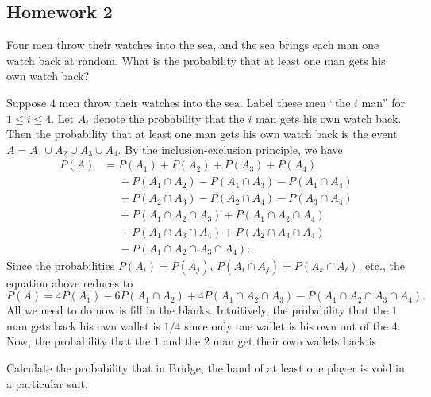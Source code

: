 \subsection{Homework 2}
\begin{problem}[Handout 2, \# 5]
  Four men throw their watches into the sea, and the sea brings each man
  one watch back at random. What is the probability that at least one man
  gets his own watch back?
\end{problem}
\begin{solution*}
  Suppose \(4\) men throw their watches into the sea. Label these men ``the
  \(i\) man'' for \(1\leq i\leq 4\). Let \(A_i\) denote the
  probability that the \(i\) man gets his own watch back. Then
  the probability that at least one man gets his own watch back is the
  event \(A=A_1\cup A_2\cup A_3\cup A_4\). By the inclusion-exclusion
  principle, we have
  \[
    \begin{aligned}
      P(
      A)&=P(A_1)+P(A_2)+P(A_3)+P(A_4)\\
      &\phantom{{}={}}-P(A_1\cap A_2)-P(A_1\cap A_3)-P(A_1\cap A_4)\\
      &\phantom{{}={}}-P(A_2\cap A_3)-P(A_2\cap A_4)-P(A_3\cap A_4)\\
      &\phantom{{}={}}+P(A_1\cap A_2\cap A_3)+P(A_1\cap A_2\cap A_4)\\
      &\phantom{{}={}}+P(A_1\cap A_3\cap A_4)+P(A_2\cap A_3\cap A_4)\\
      &\phantom{{}={}}-P(A_1\cap A_2\cap A_3\cap A_4).
    \end{aligned}
  \]
  Since the probabilities \(P(A_i)=P(A_j)\), \(P(A_i\cap A_j)=P(A_k\cap
  A_\ell)\), etc., the equation above reduces to
  \[
    P(A)=4P(A_1)-6P(A_1\cap A_2)+4P(A_1\cap A_2\cap A_3)-P(A_1\cap A_2\cap
    A_3\cap A_4).
  \]
  All we need to do now is fill in the blanks. Intuitively, the probability
  that the \(1\) man gets back his own wallet is \(1/4\) since
  only one wallet is his own out of the \(4\). Now, the probability that
  the \(1\) and the \(2\) man get their own
  wallets back is
\end{solution*}

\begin{problem}[Handout 2, \# 7]
  Calculate the probability that in Bridge, the hand of at least one player
  is void in a particular suit.
\end{problem}
\begin{solution*}
\end{solution*}


